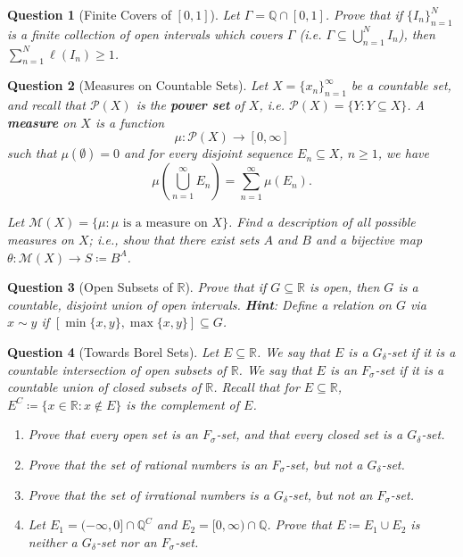 \documentclass[notoc,notitlepage]{tufte-book}
\newtheorem{assgprob}{Question}[section]
\begin{document}
\begin{assgprob}[Finite Covers of {$[0, 1]$}]
  Let $\Gamma = \mathbb{Q} \cap [0, 1]$.
  Prove that if $\{ I_n \}_{n=1}^{N}$ is a finite collection
  of open intervals which covers $\Gamma$
  (i.e. $\Gamma \subseteq \bigcup_{n=1}^{N} I_n$),
  then $\sum_{n=1}^{N} \ell(I_n) \geq 1$.
\end{assgprob}

\begin{assgprob}[Measures on Countable Sets]
  Let $X = \{ x_n \}_{n=1}^{\infty}$ be a countable set,
  and recall that $\mathcal{P}(X)$ is the \textbf{power set} of $X$,
  i.e. $\mathcal{P}(X) = \{ Y : Y \subseteq X \}$.
  A \textbf{measure} on $X$ is a function
  \begin{equation*}
    \mu : \mathcal{P}(X) \to [0, \infty]
  \end{equation*}
  such that $\mu(\emptyset) = 0$
  and for every \textit{disjoint} sequence $E_n \subseteq X$, $n \geq 1$,
  we have
  \begin{equation*}
    \mu \left( \bigcup_{n=1}^{\infty} E_n \right)
    = \sum_{n=1}^{\infty} \mu(E_n).
  \end{equation*}

  Let $\mathcal{M}(X) = \{ \mu : \mu \text{ is a measure on } X \}$.
  Find a description of all possible measures on $X$;
  i.e., show that there exist sets $A$ and $B$
  and a bijective map $\theta : \mathcal{M}(X) \to S \coloneqq B^A$.
\end{assgprob}

\begin{assgprob}[Open Subsets of $\mathbb{R}$]
  Prove that if $G \subseteq \mathbb{R}$ is open,
  then $G$ is a countable, \textit{disjoint} union of open intervals. \linebreak
  \textbf{Hint}: Define a relation on $G$ via $x \sim y$
  if $[\min \{ x, y \}, \max \{ x , y \}] \subseteq G$.
\end{assgprob}

\begin{assgprob}[Towards Borel Sets]
  Let $E \subseteq \mathbb{R}$.
  We say that $E$ is a $G_{\delta}$-set if it is
  a countable intersection of open subsets of $\mathbb{R}$.
  We say that $E$ is an $F_\sigma$-set if it is
  a countable union of closed subsets of $\mathbb{R}$.
  Recall that for $E \subseteq \mathbb{R}$,
  $E^C \coloneqq \{ x \in \mathbb{R} : x \notin E \}$ is the complement of $E$.
  \begin{enumerate}
    \item Prove that every open set is an $F_\sigma$-set,
      and that every closed set is a $G_\delta$-set.
    \item Prove that the set of rational numbers is an $F_\sigma$-set,
      but not a $G_\delta$-set.
    \item Prove that the set of irrational numbers is a $G_\delta$-set,
      but not an $F_\sigma$-set.
    \item Let $E_1 = (-\infty, 0] \cap \mathbb{Q}^C$
      and $E_2 = [0, \infty) \cap \mathbb{Q}$.
      Prove that $E \coloneqq E_1 \cup E_2$ is
      neither a $G_\delta$-set nor an $F_\sigma$-set.
  \end{enumerate}
\end{assgprob}
\end{document}
